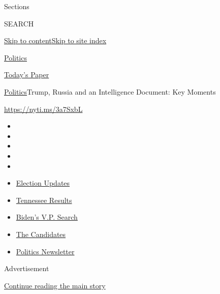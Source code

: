 Sections

SEARCH

\protect\hyperlink{site-content}{Skip to
content}\protect\hyperlink{site-index}{Skip to site index}

\href{https://www.nytimes.com/section/politics}{Politics}

\href{https://myaccount.nytimes.com/auth/login?response_type=cookie\&client_id=vi}{}

\href{https://www.nytimes.com/section/todayspaper}{Today's Paper}

\href{/section/politics}{Politics}\textbar{}Trump, Russia and an
Intelligence Document: Key Moments

\href{https://nyti.ms/3a7SxbL}{https://nyti.ms/3a7SxbL}

\begin{itemize}
\item
\item
\item
\item
\item
\end{itemize}

\begin{itemize}
\item
  \href{https://www.nytimes.com/2020/08/07/us/elections/biden-vs-trump.html?action=click\&pgtype=Article\&state=default\&region=TOP_BANNER\&context=storylines_menu}{Election
  Updates}
\item
  \href{https://www.nytimes.com/interactive/2020/08/06/us/elections/results-tennessee-primary-elections.html?action=click\&pgtype=Article\&state=default\&region=TOP_BANNER\&context=storylines_menu}{Tennessee
  Results}
\item
  \href{https://www.nytimes.com/article/biden-vice-president-2020.html?action=click\&pgtype=Article\&state=default\&region=TOP_BANNER\&context=storylines_menu}{Biden's
  V.P. Search}
\item
  \href{https://www.nytimes.com/interactive/2019/us/politics/2020-presidential-candidates.html?action=click\&pgtype=Article\&state=default\&region=TOP_BANNER\&context=storylines_menu}{The
  Candidates}
\item
  \href{https://www.nytimes.com/newsletters/politics?action=click\&pgtype=Article\&state=default\&region=TOP_BANNER\&context=storylines_menu}{Politics
  Newsletter}
\end{itemize}

Advertisement

\protect\hyperlink{after-top}{Continue reading the main story}

